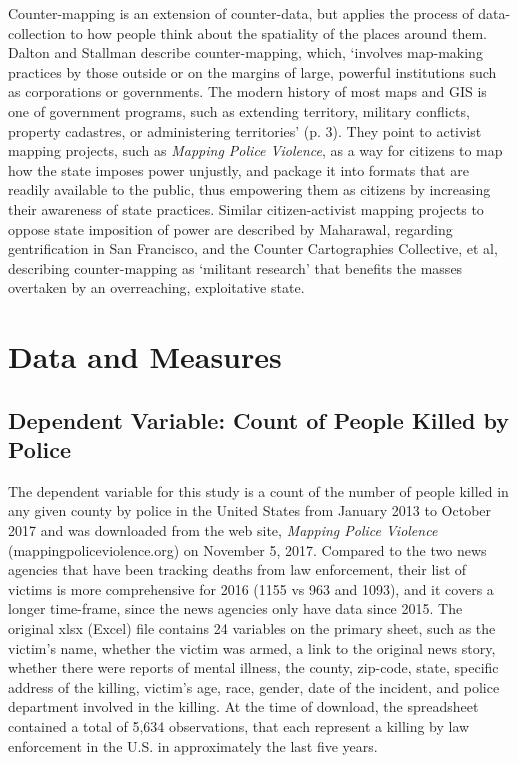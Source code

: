 \documentclass[sigconf]{acmart}
\begin{document}
Counter-mapping is an extension of counter-data, but applies the process of data-collection to how people think about the spatiality of the places around them.  Dalton and Stallman describe counter-mapping, which, `involves map-making practices by those outside or on the margins of large, powerful institutions such as corporations or governments. The modern history of most maps and GIS is one of government programs, such as extending territory, military conflicts, property cadastres, or administering territories' (p. 3). \cite{dalton17}  They point to activist mapping projects, such as {\em Mapping Police Violence}, as a way for citizens to map how the state imposes power unjustly, and package it into formats that are readily available to the public, thus empowering them as citizens by increasing their awareness of state practices. Similar citizen-activist mapping projects to oppose state imposition of power are described by Maharawal, regarding gentrification in San Francisco, and the Counter Cartographies Collective, et al, describing counter-mapping as `militant research' that benefits the masses overtaken by an overreaching, exploitative state. \cite{maharawal17,ccc12}

\section{Data and Measures}
\subsection{Dependent Variable: Count of People Killed by Police}
The dependent variable for this study is a count of the number of people killed in any given county by police in the United States from January 2013 to October 2017 and was downloaded from the web site, {\em Mapping Police Violence} (mappingpoliceviolence.org) on November 5, 2017.  Compared to the two news agencies that have been tracking deaths from law enforcement, their list of victims is more comprehensive for 2016 (1155 vs 963 and 1093), and it covers a longer time-frame, since the news agencies only have data since 2015.  The original xlsx (Excel) file contains 24 variables on the primary sheet, such as the victim's name, whether the victim was armed, a link to the original news story, whether there were reports of mental illness, the county, zip-code, state, specific address of the killing, victim's age, race, gender, date of the incident, and police department involved in the killing. At the time of download, the spreadsheet contained a total of 5,634 observations, that each represent a killing by law enforcement in the U.S. in approximately the last five years.
\end{document}
